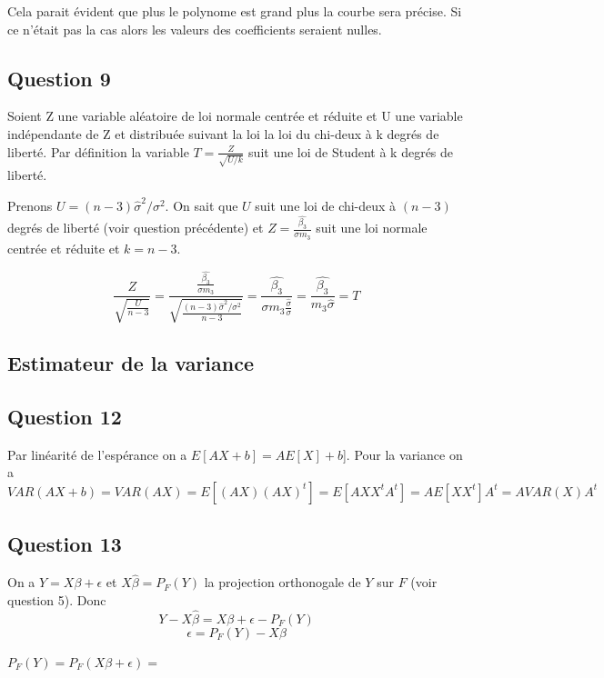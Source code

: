 \documentclass[]{book}
\theoremstyle{definition}
\begin{document}
Cela parait \'evident que plus le polynome est grand plus la courbe sera pr\'ecise. Si ce n'\'etait pas la cas alors les valeurs des coefficients seraient nulles. 

\subsection*{Question 9}
Soient Z une variable al\'eatoire de loi normale centr\'ee et r\'eduite et U une variable ind\'ependante de Z et distribu\'ee suivant la loi la loi du chi-deux \`a k degr\'es de libert\'e. Par d\'efinition la variable $T=\frac {Z}{\sqrt {U/k}}$ suit une loi de Student \`a k degr\'es de libert\'e.

Prenons $U = (n-3)\hat{\sigma}^2/\sigma^2$. On sait que $U$ suit une loi de chi-deux \`a $(n-3)$ degr\'es de libert\'e (voir question pr\'ec\'edente) et $Z = \frac{\hat{\beta_3}}{\sigma m_3}$ suit une loi normale centr\'ee et r\'eduite et $k = n-3$.

$$
\frac{Z}{\sqrt{\frac{U}{n-3}}} = \frac{\frac{\hat{\beta_3}}{\sigma m_3}}{\sqrt{\frac{(n-3)\hat{\sigma}^2/\sigma^2}{n-3}}}
= \frac{\hat{\beta_3}}{\sigma m_3 \frac{\hat{\sigma}}{\sigma}} 
= \frac{\hat{\beta_3}}{m_3 \hat{\sigma}} = T
$$

\subsection*{Estimateur de la variance}
\subsection*{Question 12}
Par lin\'earit\'e de l'esp\'erance on a $E[AX+b] = AE[X] + b$]. Pour la variance on a 
$$
VAR(AX+b) = VAR(AX) = E[(AX)(AX)^t] = E[AXX^tA^t] = AE[XX^t]A^t = AVAR(X)A^t
$$

\subsection*{Question 13}
On a $Y =  X\beta + \epsilon$ et $X\hat{\beta} = P_F(Y)$ la projection orthonogale de $Y$ sur $F$ (voir question 5).
Donc 
$$Y - X\hat{\beta} = X\beta + \epsilon - P_F(Y)$$
$$\epsilon = P_F(Y) - X\beta$$


$P_F(Y) = P_F(X\beta + \epsilon) = $
\end{document}
